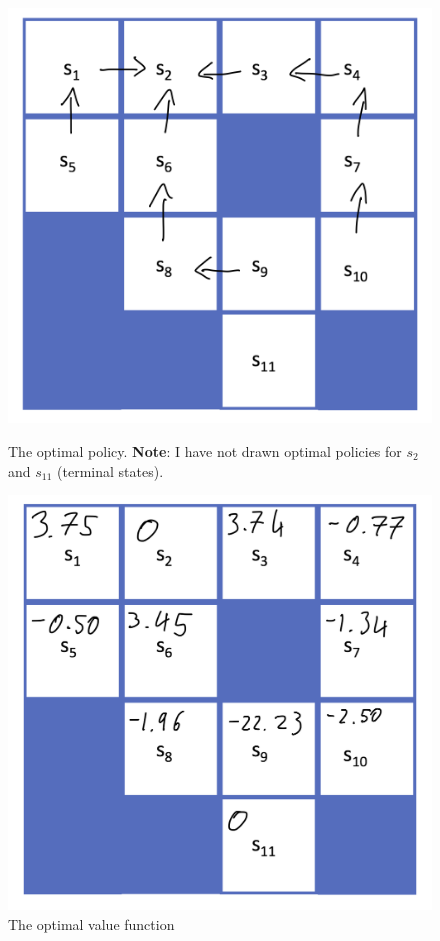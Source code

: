 \documentclass[12pt,twoside]{article}
\begin{document}
\begin{figure}[h]
    \centering
    \begin{minipage}[t]{0.35\textwidth}
        \centering %
        \includegraphics[width = 0.9\hsize]{./figures/Optimal_policy.png}
        \caption{The optimal policy. \textbf{Note}: I have not drawn optimal policies for $s_2$ and $s_{11}$ (terminal states).}
        \label{Optimal policy}
    \end{minipage}\hfill
    \begin{minipage}[t]{0.35\textwidth}
        \centering %
        \includegraphics[width = 0.9\hsize]{./figures/Optimal_state_values.png}
        \caption{The optimal value function}
        \label{Optimal value function}
    \end{minipage}
\end{figure}
\end{document}
